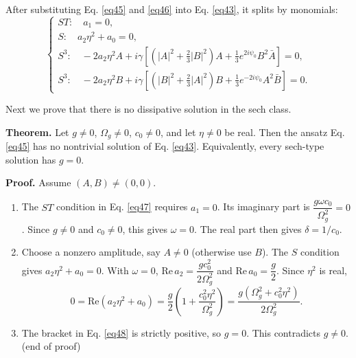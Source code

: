 \documentclass{article}
\begin{document}
            After substituting Eq. \ref{eq45} and \ref{eq46} into Eq. \ref{eq43}, it splits by monomials:
            \begin{equation} \label{eq47}
                \begin{cases}
                    \displaystyle ST:\quad a_1 = 0, \\
                    \displaystyle S:\quad a_2\eta^2 + a_0 = 0, \\
                    \displaystyle S^3:\quad -2a_2\eta^2 A + i\gamma\left[\left(\left|A\right|^2+\frac{2}{3}\left|B\right|^2\right)A + \frac{1}{3}e^{2i\psi_{0}}B^2\bar A\right] = 0, \\
                    \displaystyle S^3:\quad -2a_2\eta^2 B + i\gamma\left[\left(\left|B\right|^2+\frac{2}{3}\left|A\right|^2\right)B + \frac{1}{3}e^{-2i\psi_{0}}A^2\bar B\right] = 0.
                \end{cases}
            \end{equation}

            Next we prove that there is no dissipative solution in the sech class.

            \textbf{Theorem.} Let $g\neq0$, $\Omega_g\neq0$, $c_0\neq0$, and let $\eta\neq0$ be real. Then the ansatz Eq. \ref{eq45} has no nontrivial solution of Eq. \ref{eq43}. Equivalently, every sech-type solution has $g=0$.

            \textbf{Proof.} Assume $(A,B)\neq(0,0)$.
            \begin{enumerate}
                \item The $ST$ condition in Eq. \ref{eq47} requires $a_1 = 0$. Its imaginary part is $\dfrac{g\omega c_0}{\Omega_g^2}=0$. Since $g\neq0$ and $c_0\neq0$, this gives $\omega=0$. The real part then gives $\delta = 1/c_0$.
                \item Choose a nonzero amplitude, say $A\neq0$ (otherwise use $B$). The $S$ condition gives $a_2\eta^2 + a_0 = 0$. With $\omega=0$, $\mathrm{Re}\,a_2 = \dfrac{gc_0^2}{2\Omega_g^2}$ and $\mathrm{Re}\,a_0 = \dfrac{g}{2}$. Since $\eta^2$ is real,
                \begin{equation} \label{eq48}
                    0 = \mathrm{Re}\left(a_2\eta^2 + a_0\right) = \frac{g}{2}\left(1 + \frac{c_0^2\eta^2}{\Omega_g^2}\right) = \frac{g\left(\Omega_g^2 + c_0^2\eta^2\right)}{2\Omega_g^2}.
                \end{equation}
                \item The bracket in Eq. \ref{eq48} is strictly positive, so $g=0$. This contradicts $g\neq0$. \hfill(end of proof)
            \end{enumerate}
\end{document}
